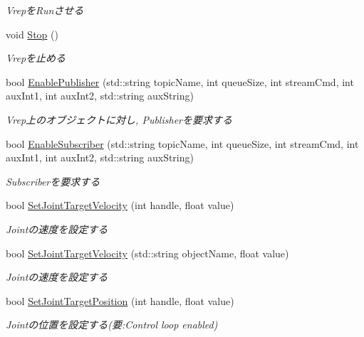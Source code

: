 \begin{DoxyCompactItemize}
\begin{DoxyCompactList}\small\item\em Vrepを\-Runさせる \end{DoxyCompactList}\item 
void \hyperlink{classMyVrep_a387d7d9d10e95262e702ca4ff359ce43}{Stop} ()\label{classMyVrep_a387d7d9d10e95262e702ca4ff359ce43}

\begin{DoxyCompactList}\small\item\em Vrepを止める \end{DoxyCompactList}\item 
bool \hyperlink{classMyVrep_a8061008dfc3351fdafe0fb3358fb9388}{Enable\-Publisher} (std\-::string topic\-Name, int queue\-Size, int stream\-Cmd, int aux\-Int1, int aux\-Int2, std\-::string aux\-String)
\begin{DoxyCompactList}\small\item\em Vrep上のオブジェクトに対し, Publisherを要求する \end{DoxyCompactList}\item 
bool \hyperlink{classMyVrep_a734773fc7f7d689c40b5b37c52b3a6fd}{Enable\-Subscriber} (std\-::string topic\-Name, int queue\-Size, int stream\-Cmd, int aux\-Int1, int aux\-Int2, std\-::string aux\-String)
\begin{DoxyCompactList}\small\item\em Subscriberを要求する \end{DoxyCompactList}\item 
bool \hyperlink{classMyVrep_a9e1258779476a3a542c645bc459f15e8}{Set\-Joint\-Target\-Velocity} (int handle, float value)
\begin{DoxyCompactList}\small\item\em Jointの速度を設定する \end{DoxyCompactList}\item 
bool \hyperlink{classMyVrep_aca1cfd8c74c214136c5a702e99f06ec9}{Set\-Joint\-Target\-Velocity} (std\-::string object\-Name, float value)
\begin{DoxyCompactList}\small\item\em Jointの速度を設定する　 \end{DoxyCompactList}\item 
bool \hyperlink{classMyVrep_a6da9c0dcdcfad80b1a1d0ef52a20ca7a}{Set\-Joint\-Target\-Position} (int handle, float value)
\begin{DoxyCompactList}\small\item\em Jointの位置を設定する(要\-:Control loop enabled) \end{DoxyCompactList}\item 

\end{DoxyCompactItemize}
